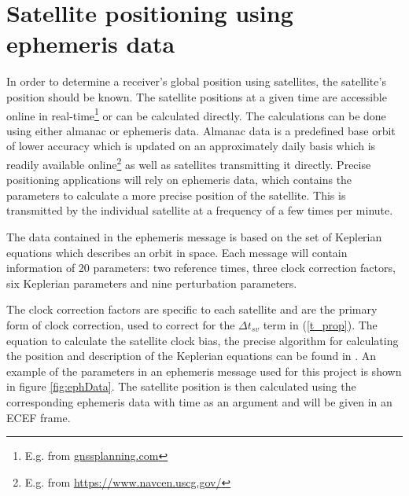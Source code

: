 \section{Satellite positioning using ephemeris data}\label{chap:ephPositioning}
In order to determine a receiver's global position using satellites, the satellite's position should be known. The satellite positions at a given time are accessible online in real-time\footnote{ E.g. from \url{gnssplanning.com} }
or can be calculated directly. The calculations can be done using either almanac or ephemeris data. Almanac data is a predefined base orbit of lower accuracy which is updated on an approximately daily basis which is readily available online\footnote{E.g. from \url{https://www.navcen.uscg.gov/}}
as well as satellites transmitting it directly. Precise positioning applications will rely on ephemeris data, which contains the parameters to calculate a more precise position of the satellite. This is transmitted by the individual satellite at a frequency of a few times per minute.
\par
The  data contained in the ephemeris message is based on the set of Keplerian equations which describes an orbit in space. 
Each message will contain information of 20 parameters: two reference times, three clock correction factors, six Keplerian parameters and nine perturbation parameters. 
\par
The clock correction factors are specific to each satellite and are the primary form of clock correction, used to correct for the $\Delta t_{sv}$ term in (\ref{t_prop}). The equation to calculate the satellite clock bias, the precise algorithm for calculating the position and description of the Keplerian equations can be found in \cite{dunn2012global}. An example of the parameters in an ephemeris message used for this project is shown in figure \ref{fig:ephData}. The satellite position is then calculated using the corresponding ephemeris data with time as an argument and will be given in an ECEF frame.
